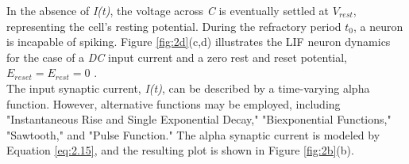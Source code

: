 \noindent In the absence of \textit{I(t)}, the voltage across \textit{C} is eventually settled at $V_{rest}$, representing the cell's resting potential. During the refractory period $t_0$, a neuron is incapable of spiking. Figure \ref{fig:2d}(c,d) illustrates the LIF neuron dynamics for the case of a \textit{DC} input current and a zero rest and reset potential, $E_{reset} = E_{rest} = 0$ \cite{tal1997computing}. \\

\noindent The input synaptic current, \textit{I(t)}, can be described by a time-varying alpha function. However, alternative functions may be employed, including "Instantaneous Rise and Single Exponential Decay," "Biexponential Functions," "Sawtooth," and "Pulse Function." The alpha synaptic current is modeled by Equation \ref{eq:2.15}, and the resulting plot is shown in Figure \ref{fig:2b}(b). \\







